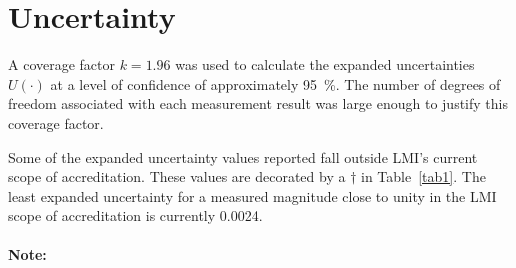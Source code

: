 \documentclass[11pt,a4paper]{LMIReport}
\begin{document}
\section{Uncertainty}
A coverage factor $k=1.96$ was used to calculate the expanded uncertainties $U(\cdot)$ at a level of confidence of approximately \SI{95}{\percent}. 
The number of degrees of freedom associated with each measurement result was large enough to justify this coverage factor.  

Some of the expanded uncertainty values reported fall outside LMI's current scope of accreditation. 
These values are decorated by a $\dagger$ in Table~\ref{tab1}. 
The least expanded uncertainty for a measured magnitude close to unity in the LMI scope of accreditation is currently 0.0024. 

\paragraph{Note:} 	%

\end{document}
